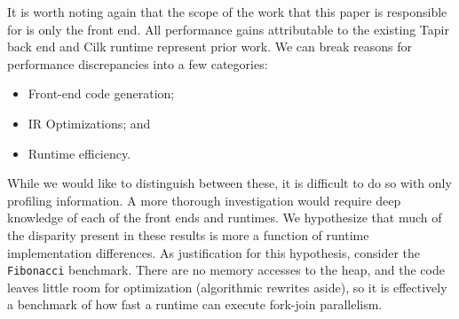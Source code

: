 \documentclass[sigconf]{acmart}
\newcommand{\wmnote}[1]{{\scriptsize \color{red} [[ Billy: #1]]}}
\begin{document}
It is worth noting again that the scope of the work that this paper is
responsible for is only the front end. All performance gains attributable to
the existing Tapir back end and Cilk runtime represent prior work.  We can
break reasons for performance discrepancies into a few categories:
\begin{itemize}
\item Front-end code generation;
\item IR Optimizations; and
\item Runtime efficiency.
\end{itemize}
While we would like to distinguish between these, it is difficult to do so with
only profiling information. A more thorough investigation would require deep
knowledge of each of the front ends and runtimes. We hypothesize that much of
the disparity present in these results is more a function of runtime
implementation differences. As justification for this hypothesis, consider the
\texttt{Fibonacci} benchmark. There are no memory accesses to the heap, and the
code leaves little room for optimization (algorithmic rewrites aside), so it is
effectively a benchmark of how fast a runtime can execute fork-join
parallelism.

\end{document}
